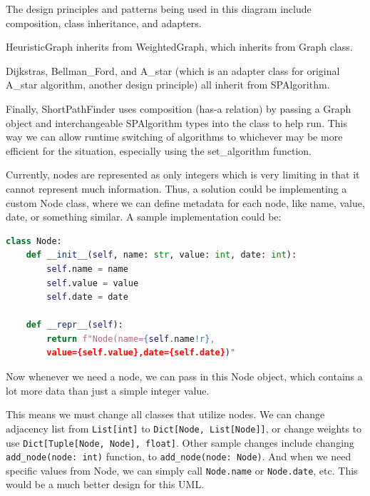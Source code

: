 \documentclass{article}
\begin{document}
\begin{onehalfspace}
The design principles and patterns being used in this diagram include composition, class inheritance, and adapters. 

HeuristicGraph inherits from WeightedGraph, which inherits from Graph class.

Dijkstras, Bellman\_Ford, and A\_star (which is an adapter class for original A\_star algorithm, another design principle) all inherit from SPAlgorithm.

Finally, ShortPathFinder uses composition (has-a relation) by passing a Graph object and interchangeable SPAlgorithm types into the class to help run. This way we can allow runtime switching of algorithms to whichever may be more efficient for the situation, especially using the set\_algorithm function.

Currently, nodes are represented as only integers which is very limiting in that it cannot represent much information. Thus, a solution could be implementing a custom Node class, where we can define metadata for each node, like name, value, date, or something similar. A sample implementation could be:

\begin{lstlisting}[language=Python]
class Node:
    def __init__(self, name: str, value: int, date: int):
        self.name = name
        self.value = value
        self.date = date

    def __repr__(self):
        return f"Node(name={self.name!r},
        value={self.value},date={self.date})"
\end{lstlisting}

Now whenever we need a node, we can pass in this Node object, which contains a lot more data than just a simple integer value.

This means we must change all classes that utilize nodes. We can change adjacency list from \texttt{List[int]} to \texttt{Dict[Node, List[Node]]}, or change weights to use \texttt{Dict[Tuple[Node, Node], float]}. Other sample changes include changing \texttt{add\_node(node: int)} function, to \texttt{add\_node(node: Node)}. And when we need specific values from Node, we can simply call \texttt{Node.name} or \texttt{Node.date}, etc. This would be a much better design for this UML.

\end{onehalfspace}
\end{document}
